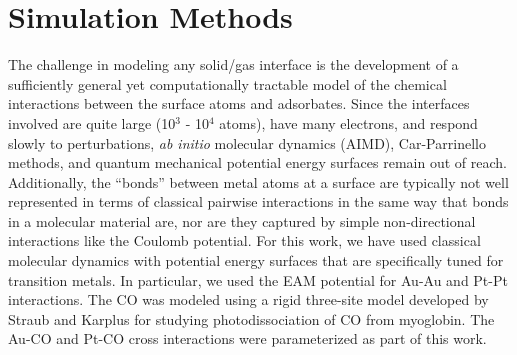 
\section{Simulation Methods}
The challenge in modeling any solid/gas interface is the development
of a sufficiently general yet computationally tractable model of the
chemical interactions between the surface atoms and adsorbates.  Since
the interfaces involved are quite large (10$^3$ - 10$^4$ atoms), have
many electrons, and respond slowly to perturbations, {\it ab initio}
molecular dynamics
(AIMD),\citep{Kresse:1993ve, Kresse:1993qf, Kresse:1994ul} Car-Parrinello
methods,\citep{Car:1985bh, Izvekov:2000fv, Guidelli:2000fy} and quantum
mechanical potential energy surfaces remain out of reach.
Additionally, the ``bonds'' between metal atoms at a surface are
typically not well represented in terms of classical pairwise
interactions in the same way that bonds in a molecular material are,
nor are they captured by simple non-directional interactions like the
Coulomb potential.  For this work, we have used classical molecular
dynamics with potential energy surfaces that are specifically tuned
for transition metals.  In particular, we used the EAM potential for
Au-Au and Pt-Pt interactions.\citep{Foiles:1986ky} The CO was modeled using
a rigid three-site model developed by Straub and Karplus for studying
photodissociation of CO from myoglobin.\citep{Straub:1991no} The Au-CO and
Pt-CO cross interactions were parameterized as part of this work.
  
